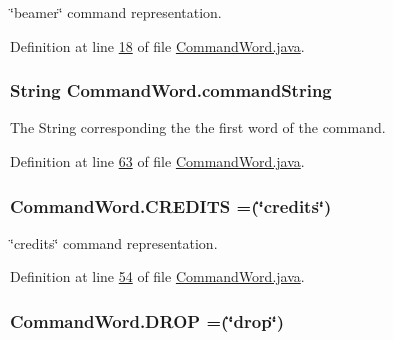 \char`\"{}beamer\char`\"{} command representation. 



Definition at line \hyperlink{CommandWord_8java_source_l00018}{18} of file \hyperlink{CommandWord_8java_source}{Command\-Word.\-java}.

\hypertarget{enumCommandWord_ae396b905ac83b5717c56b67e1e47aeef}{
\subsubsection[{command\-String}]{\setlength{\rightskip}{0pt plus 5cm}String Command\-Word.\-command\-String\hspace{0.3cm}{\ttfamily [private]}}}\label{enumCommandWord_ae396b905ac83b5717c56b67e1e47aeef}


The String corresponding the the first word of the command. 



Definition at line \hyperlink{CommandWord_8java_source_l00063}{63} of file \hyperlink{CommandWord_8java_source}{Command\-Word.\-java}.

\hypertarget{enumCommandWord_aff84c19093cea7bf97301062fe61e0a4}{
\subsubsection[{C\-R\-E\-D\-I\-T\-S}]{\setlength{\rightskip}{0pt plus 5cm}Command\-Word.\-C\-R\-E\-D\-I\-T\-S =(\char`\"{}credits\char`\"{})}}\label{enumCommandWord_aff84c19093cea7bf97301062fe61e0a4}


\char`\"{}credits\char`\"{} command representation. 



Definition at line \hyperlink{CommandWord_8java_source_l00054}{54} of file \hyperlink{CommandWord_8java_source}{Command\-Word.\-java}.

\hypertarget{enumCommandWord_a68dbdfb6cdd48bebfc70980afad6d453}{
\subsubsection[{D\-R\-O\-P}]{\setlength{\rightskip}{0pt plus 5cm}Command\-Word.\-D\-R\-O\-P =(\char`\"{}drop\char`\"{})}}\label{enumCommandWord_a68dbdfb6cdd48bebfc70980afad6d453}


